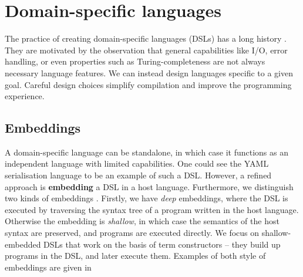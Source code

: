 
\section{Domain-specific languages}
\label{domain-specific-languages}

The practice of creating domain-specific languages (DSLs) has a long history \cite{hudak1996building}. They are motivated by the observation that general capabilities like I/O, error handling, or even properties such as Turing-completeness are not always necessary language features. We can instead design languages specific to a given goal. Careful design choices simplify compilation and improve the programming experience.

\subsection{Embeddings}

A domain-specific language can be standalone, in which case it functions as an independent language with limited capabilities. One could see the YAML serialisation language to be an example of such a DSL. However, a refined approach is \textbf{embedding} a DSL in a host language. Furthermore, we distinguish two kinds of embeddings \cite{gibbons2014folding}. Firstly, we have \textit{deep} embeddings, where the DSL is executed by traversing the syntax tree of a program written in the host language. Otherwise the embedding is \textit{shallow}, in which case the semantics of the host syntax are preserved, and programs are executed directly. We focus on shallow-embedded DSLs that work on the basis of term constructors -- they build up programs in the DSL, and later execute them. Examples of both style of embeddings are given in 

